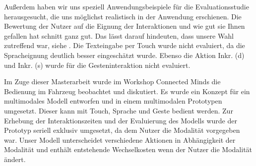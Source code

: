 Außerdem haben wir uns speziell Anwendungsbeispiele für die Evaluationsstudie herausgesucht, die uns möglichst realistisch in der Anwendung erschienen. Die Bewertung der Nutzer auf die Eignung der Interaktionen und wie gut sie Ihnen gefallen hat schnitt ganz gut. Das lässt darauf hindeuten, dass unsere Wahl zutreffend war, siehe .
Die Texteingabe per Touch wurde nicht evaluiert, da die Spracheignung deutlich besser eingeschätzt wurde. Ebenso die Aktion Inkr. (d) und Inkr. (s) wurde für die Gesteninteraktion nicht evaluiert. 

Im Zuge dieser Masterarbeit wurde im Workshop Connected Minds die Bedienung im Fahrzeug beobachtet und diskutiert. Es wurde ein Konzept für ein multimodales Modell entworfen und in einem multimodalen Prototypen umgesetzt. Dieser kann mit Touch, Sprache und Geste bedient werden. Zur Erhebung der Interaktionszeiten und der Evaluierung des Modells wurde der Prototyp seriell exklusiv umgesetzt, da dem Nutzer die Modalität vorgegeben war. Unser Modell unterscheidet verschiedene Aktionen in Abhängigkeit der Modalität und enthält entstehende Wechselkosten wenn der Nutzer die Modalität ändert. 